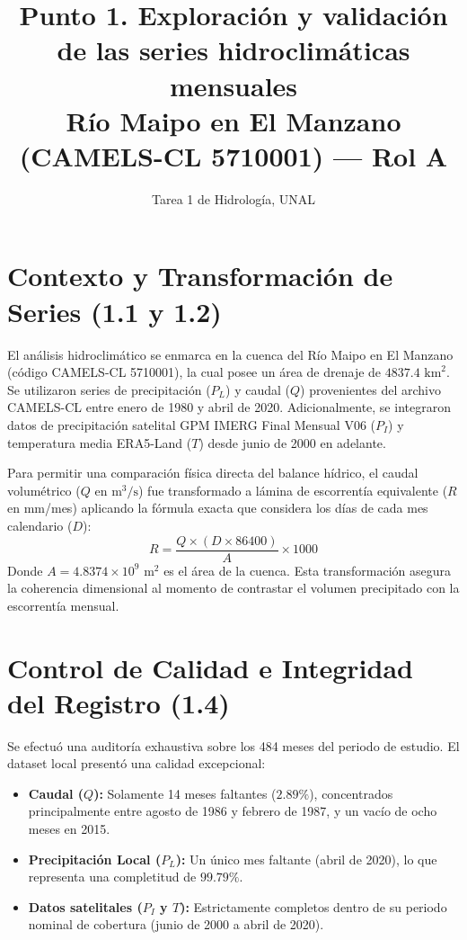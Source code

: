 \documentclass[11pt,letterpaper]{article}
\title{Punto 1. Exploración y validación de las series hidroclimáticas mensuales\\
\large Río Maipo en El Manzano (CAMELS-CL 5710001) --- Rol A}
\author{Tarea 1 de Hidrología, UNAL}
\date{}
\begin{document}
\sloppy
\maketitle

\section{Contexto y Transformación de Series (1.1 y 1.2)}

El análisis hidroclimático se enmarca en la cuenca del Río Maipo en El Manzano (código CAMELS-CL 5710001), la cual posee un área de drenaje de $4837.4\text{ km}^2$. Se utilizaron series de precipitación ($P_L$) y caudal ($Q$) provenientes del archivo CAMELS-CL entre enero de 1980 y abril de 2020. Adicionalmente, se integraron datos de precipitación satelital GPM IMERG Final Mensual V06 ($P_I$) y temperatura media ERA5-Land ($T$) desde junio de 2000 en adelante.

Para permitir una comparación física directa del balance hídrico, el caudal volumétrico ($Q$ en $\text{m}^3/\text{s}$) fue transformado a lámina de escorrentía equivalente ($R$ en mm/mes) aplicando la fórmula exacta que considera los días de cada mes calendario ($D$):
\begin{equation}
R = \frac{Q \times (D \times 86400)}{A} \times 1000
\end{equation}
Donde $A = 4.8374 \times 10^9\text{ m}^2$ es el área de la cuenca. Esta transformación asegura la coherencia dimensional al momento de contrastar el volumen precipitado con la escorrentía mensual.

\section{Control de Calidad e Integridad del Registro (1.4)}

Se efectuó una auditoría exhaustiva sobre los 484 meses del periodo de estudio. El dataset local presentó una calidad excepcional:
\begin{itemize}
    \item \textbf{Caudal ($Q$):} Solamente 14 meses faltantes ($2.89\%$), concentrados principalmente entre agosto de 1986 y febrero de 1987, y un vacío de ocho meses en 2015.
    \item \textbf{Precipitación Local ($P_L$):} Un único mes faltante (abril de 2020), lo que representa una completitud de $99.79\%$.
    \item \textbf{Datos satelitales ($P_I$ y $T$):} Estrictamente completos dentro de su periodo nominal de cobertura (junio de 2000 a abril de 2020).
\end{itemize}
\end{document}
